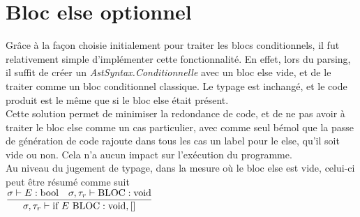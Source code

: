 \documentclass[french]{article}
\newcommand{\jugementElseOpt}{
        \dfrac{\sigma \vdash E : \text{bool} \hspace*{10pt} \sigma, \tau_r \vdash \text{BLOC} : \text{void}}
              {\sigma, \tau_r \vdash \text{if } E \text{ BLOC} : \text{void}, []}
        }
\begin{document}
\section{Bloc else optionnel}
Grâce à la façon choisie initialement pour traiter les blocs conditionnels, il fut relativement simple d'implémenter cette fonctionnalité.
En effet, lors du parsing, il suffit de créer un \textit{AstSyntax.Conditionnelle} avec un bloc else vide, et de le traiter comme un bloc conditionnel classique.
Le typage est inchangé, et le code produit est le même que si le bloc else était présent. \\
Cette solution permet de minimiser la redondance de code, et de ne pas avoir à traiter le bloc else comme un cas particulier, avec comme seul bémol
que la passe de génération de code rajoute dans tous les cas un label pour le else, qu'il soit vide ou non. Cela n'a aucun impact sur l'exécution du programme. \\
Au niveau du jugement de typage, dans la mesure où le bloc else est vide, celui-ci peut être résumé comme suit \\
\(\jugementElseOpt\) 
\end{document}
